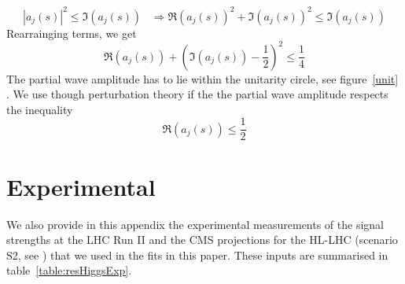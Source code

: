 \begin{equation}
	| a_j(s)|^2 \leq \mathfrak{I} (a_j(s)) \;\;\; \Rightarrow \mathfrak{R} (a_j(s))^2+ \mathfrak{I} (a_j(s))^2 \leq \mathfrak{I} (a_j(s))
\end{equation}
Rearrainging terms, we get
\begin{equation}
	\mathfrak{R} (a_j(s)) +\left( \mathfrak{I} (a_j(s))- \frac{1}{2} \right)^2 \leq \frac{1}{4}
\end{equation}
The partial wave amplitude has to lie within the unitarity circle, see figure~\ref{unit} . We use though perturbation theory if the the partial wave amplitude respects the inequality
\begin{equation}
	\mathfrak{R} (a_j(s)) \leq \frac{1}{2}
\end{equation}

\section{Experimental}
We also provide in this appendix the experimental measurements of the signal strengths at the LHC Run II and the CMS projections for the HL-LHC (scenario S2, see \cite{Cepeda:2019klc}) that we used in the fits in this paper. These inputs are summarised in table~\ref{table:resHiggsExp}.
\newpage
\begingroup
 
\endgroup